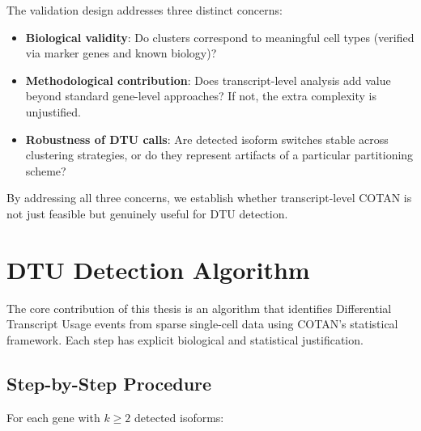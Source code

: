 The validation design addresses three distinct concerns:

\begin{itemize}
    \item \textbf{Biological validity}: Do clusters correspond to meaningful cell types (verified via marker genes and known biology)?
    \item \textbf{Methodological contribution}: Does transcript-level analysis add value beyond standard gene-level approaches? If not, the extra complexity is unjustified.
    \item \textbf{Robustness of DTU calls}: Are detected isoform switches stable across clustering strategies, or do they represent artifacts of a particular partitioning scheme?
\end{itemize}

By addressing all three concerns, we establish whether transcript-level COTAN is not just feasible but genuinely useful for DTU detection.

\section{DTU Detection Algorithm}\label{sec:methods-dtu-algorithm}

The core contribution of this thesis is an algorithm that identifies Differential Transcript Usage events from sparse single-cell data using COTAN's statistical framework. Each step has explicit biological and statistical justification.

\subsection*{Step-by-Step Procedure}

For each gene with $k \ge 2$ detected isoforms:


